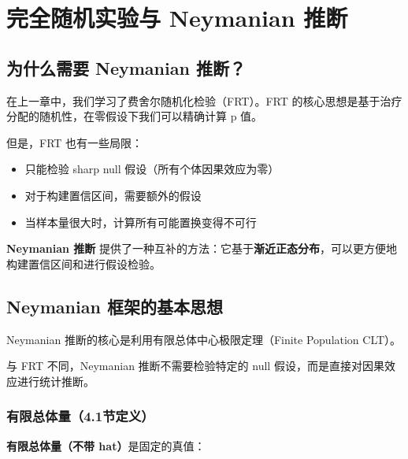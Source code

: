 
\chapter{完全随机实验与 Neymanian 推断}

\section{为什么需要 Neymanian 推断？}

在上一章中，我们学习了费舍尔随机化检验（FRT）。FRT 的核心思想是基于治疗分配的随机性，在零假设下我们可以精确计算 p 值。

但是，FRT 也有一些局限：
\begin{itemize}
  \item 只能检验 sharp null 假设（所有个体因果效应为零）
  \item 对于构建置信区间，需要额外的假设
  \item 当样本量很大时，计算所有可能置换变得不可行
\end{itemize}

\textbf{Neymanian 推断} 提供了一种互补的方法：它基于\textbf{渐近正态分布}，可以更方便地构建置信区间和进行假设检验。

\section{Neymanian 框架的基本思想}

Neymanian 推断的核心是利用有限总体中心极限定理（Finite Population CLT）。

与 FRT 不同，Neymanian 推断不需要检验特定的 null 假设，而是直接对因果效应进行统计推断。


\subsection{有限总体量（4.1节定义）}

\textbf{有限总体量（不带 hat）}是固定的真值：

